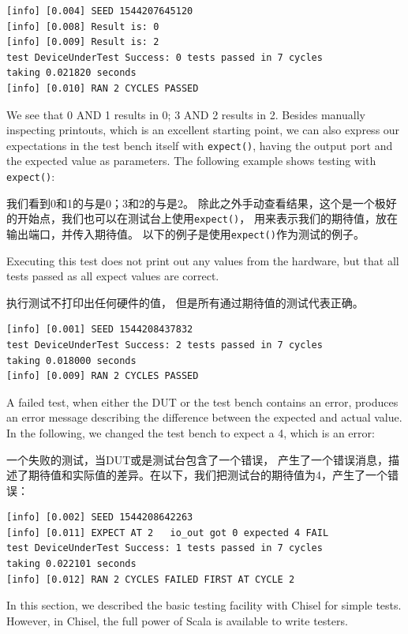 \documentclass[%
    10pt,
    headinclude, footexclude,
    openright, %
    notitlepage,
    cleardoubleempty,
    headsepline,
    pointlessnumbers,
    bibtotoc, idxtotoc,
    ]{scrbook}
\newcommand{\code}[1]{{\small{\texttt{#1}}}}
\newcommand{\todo}[1]{{\emph{TODO: #1}}}
\renewcommand{\todo}[1]{}
\begin{document}
\begin{verbatim}
[info] [0.004] SEED 1544207645120
[info] [0.008] Result is: 0
[info] [0.009] Result is: 2
test DeviceUnderTest Success: 0 tests passed in 7 cycles
taking 0.021820 seconds
[info] [0.010] RAN 2 CYCLES PASSED
\end{verbatim}

\noindent We see that 0 AND 1 results in 0; 3 AND 2 results in 2.
Besides manually inspecting printouts, which is an excellent starting point, we can also
express our expectations in the test bench itself with \code{expect()},
having the output port and the expected value as parameters.
The following example shows testing with \code{expect()}:

\noindent 我们看到0和1的与是0；3和2的与是2。
除此之外手动查看结果，这个是一个极好的开始点，我们也可以在测试台上使用\code{expect()}，
用来表示我们的期待值，放在输出端口，并传入期待值。
以下的例子是使用\code{expect()}作为测试的例子。


\noindent Executing this test does not print out any values from the hardware,
but that all tests passed as all expect values are correct.

\noindent 执行测试不打印出任何硬件的值，
但是所有通过期待值的测试代表正确。

\begin{verbatim}
[info] [0.001] SEED 1544208437832
test DeviceUnderTest Success: 2 tests passed in 7 cycles
taking 0.018000 seconds
[info] [0.009] RAN 2 CYCLES PASSED
\end{verbatim}

\noindent A failed test, when either the DUT or the test bench contains an error,
produces an error message describing the difference between the expected and actual
value. In the following, we changed the test bench to expect a 4, which is an error:

\noindent 一个失败的测试，当DUT或是测试台包含了一个错误，
产生了一个错误消息，描述了期待值和实际值的差异。在以下，我们把测试台的期待值为4，产生了一个错误：

\begin{verbatim}
[info] [0.002] SEED 1544208642263
[info] [0.011] EXPECT AT 2   io_out got 0 expected 4 FAIL
test DeviceUnderTest Success: 1 tests passed in 7 cycles
taking 0.022101 seconds
[info] [0.012] RAN 2 CYCLES FAILED FIRST AT CYCLE 2
\end{verbatim}

In this section, we described the basic testing facility with Chisel for simple tests.
However, in Chisel, the full power of Scala is available to write testers.
\todo{Have a link to the not yet written section for: We will show these possibilities later.}
\end{document}
